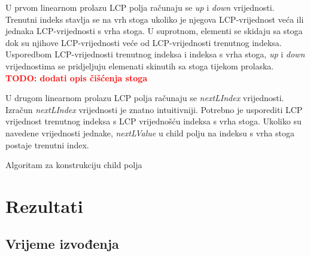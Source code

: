 \documentclass[times, utf8, seminar, numeric]{fer}
\newcommand\todo[1]{\textbf{\textcolor{red}{TODO: #1}}}
\begin{document}
U prvom linearnom prolazu LCP polja računaju se \textit{up} i \textit{down} vrijednosti. Trenutni indeks stavlja se na vrh stoga ukoliko je njegova LCP-vrijednost veća ili jednaka LCP-vrijednosti s vrha stoga. U suprotnom, elementi se skidaju sa stoga dok su njihove LCP-vrijednosti veće od LCP-vrijednosti trenutnog indeksa. Usporedbom LCP-vrijednosti trenutnog indeksa i indeksa s vrha stoga, \textit{up} i \textit{down} vrijednostima se pridjeljuju elemenati skinutih sa stoga tijekom prolaska. \todo{dodati opis čišćenja stoga}

U drugom linearnom prolazu LCP polja računaju se \textit{nextLIndex} vrijednosti. Izračun \textit{nextLIndex} vrijednosti je znatno intuitivniji. Potrebno je usporediti LCP vrijednost trenutnog indeksa s LCP vrijednošću indeksa s vrha stoga. Ukoliko su navedene vrijednosti jednake, \textit{nextLValue} u child polju na indeksu s vrha stoga  postaje trenutni index.

\begin{algorithm}[h]
	\caption{Algoritam za konstrukciju child polja}
	\label{alg:child-array}

	
\end{algorithm}

\chapter{Rezultati}


\section{Vrijeme izvođenja}
\end{document}
